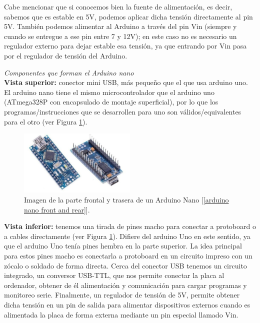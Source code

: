 \documentclass[12pt]{article}
\begin{document}
	\noindent Cabe mencionar que si conocemos bien la fuente de alimentación, es decir, sabemos que es estable en 5V, podemos aplicar dicha tensión directamente al pin 5V. También podemos alimentar al Arduino a través del pin Vin (siempre y cuando se entregue a ese pin entre 7 y 12V); en este caso no es necesario un regulador externo para dejar estable esa tensión, ya que entrando por Vin pasa por el regulador de tensión del Arduino. 
	
	\pagebreak
	
	
	\noindent \textit{Componentes que forman el Arduino nano} \\
	
	\noindent \textbf{Vista superior:} conector mini USB, más pequeño que el que usa arduino uno. El arduino nano tiene el mismo microcontrolador que el arduino uno (ATmega328P con encapsulado de montaje superficial), por lo que los programas/instrucciones que se desarrollen para uno son válidos/equivalentes para el otro (ver Figura \ref{arduino rear and front}). \\
	
	\begin{figure}[h!]
		\begin{center}
			\includegraphics[width=0.5\textwidth]{img/front_rear_arduino.jpg}
			\caption{Imagen de la parte frontal y trasera de un Arduino Nano [\ref{arduino nano front and rear}].}
			\label{arduino rear and front}
		\end{center}
	\end{figure}
	
	\noindent \textbf{Vista inferior:} tenemos una tirada de pines macho para conectar a protoboard o a cables directamente (ver Figura \ref{arduino rear and front}). Difiere del arduino Uno en este sentido, ya que el arduino Uno tenía pines hembra en la parte superior. La idea principal para estos pines macho es conectarla a protoboard en un circuito impreso con un zócalo o soldado de forma directa.
	Cerca del conector USB tenemos un circuito integrado, un conversor USB-TTL, que nos permite conectar la placa al ordenador, obtener de él alimentación y comunicación para cargar programas y monitoreo serie. Finalmente, un regulador de tensión de 5V, permite obtener dicha tensión en un pin de salida para alimentar dispositivos externos cuando es alimentada la placa de forma externa mediante un pin especial llamado Vin.  \\
\end{document}
